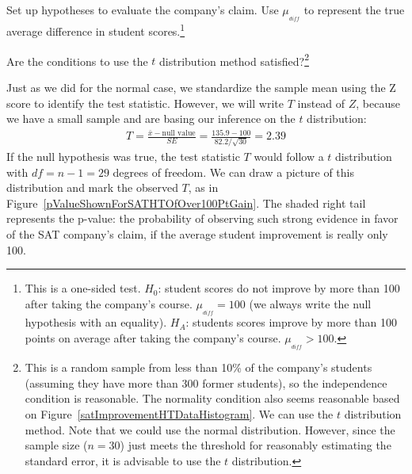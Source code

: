 \begin{exercise}
Set up hypotheses to evaluate the company's claim. Use $\mu_{_{diff}}$ to represent the true average difference in student scores.\footnote{This is a one-sided test. $H_0$: student scores do not improve by more than 100 after taking the company's course. $\mu_{_{diff}} = 100$ (we always write the null hypothesis with an equality). $H_A$: students scores improve by more than 100 points on average after taking the company's course. $\mu_{_{diff}} > 100$.}
\end{exercise}

\begin{exercise}
Are the conditions to use the $t$ distribution method satisfied?\footnote{This is a random sample from less than 10\% of the company's students (assuming they have more than 300 former students), so the independence condition is reasonable. The normality condition also seems reasonable based on Figure~\ref{satImprovementHTDataHistogram}. We can use the $t$ distribution method. Note that we could use the normal distribution. However, since the sample size ($n=30$) just meets the threshold for reasonably estimating the standard error, it is advisable to use the $t$ distribution.}
\end{exercise}

Just as we did for the normal case, we standardize the sample mean using the Z score to identify the test statistic. However, we will write $T$ instead of $Z$, because we have a small sample and are basing our inference on the $t$ distribution:
\begin{eqnarray*}
T = \frac{\bar{x} - \text{null value}}{SE} = \frac{135.9 - 100}{82.2/\sqrt{30}} = 2.39
\end{eqnarray*}
If the null hypothesis was true, the test statistic $T$ would follow a $t$ distribution with $df = n-1 = 29$ degrees of freedom. We can draw a picture of this distribution and mark the observed $T$, as in Figure~\ref{pValueShownForSATHTOfOver100PtGain}. The shaded right tail represents the p-value: the probability of observing such strong evidence in favor of the SAT company's claim, if the average student improvement is really only 100.

